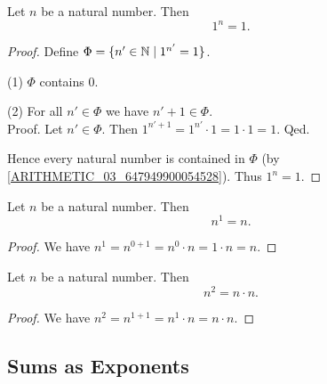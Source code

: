 \documentclass[10pt]{article}
\begin{document}
  \begin{forthel}
    \begin{proposition}
      Let $n$ be a natural number.
      Then \[ 1^{n} = 1. \]
    \end{proposition}
    \begin{proof}
      Define $\Phi = \{ n' \in \mathbb{N} \mid 1^{n'} = 1 \}$.

      (1) $\Phi$ contains $0$.

      (2) For all $n' \in \Phi$ we have $n' + 1 \in \Phi$. \\
      Proof.
        Let $n' \in \Phi$.
        Then $1^{n' + 1}
          = 1^{n'} \cdot 1
          = 1 \cdot 1
          = 1$.
      Qed.

      Hence every natural number is contained in $\Phi$ (by \cref{ARITHMETIC_03_647949900054528}).
      Thus $1^{n} = 1$.
    \end{proof}
  \end{forthel}

  \begin{forthel}
    \begin{proposition}
      Let $n$ be a natural number.
      Then \[ n^{1} = n. \]
    \end{proposition}
    \begin{proof}
      We have $n^{1}
        = n^{0 + 1}
        = n^{0} \cdot n
        = 1 \cdot n
        = n$.
    \end{proof}
  \end{forthel}

  \begin{forthel}
    \begin{proposition}
      Let $n$ be a natural number.
      Then \[ n^{2} = n \cdot n. \]
    \end{proposition}
    \begin{proof}
      We have $n^{2}
        = n^{1 + 1}
        = n^{1} \cdot n
        = n \cdot n$.
    \end{proof}
  \end{forthel}


  \subsection{Sums as Exponents}
\end{document}
